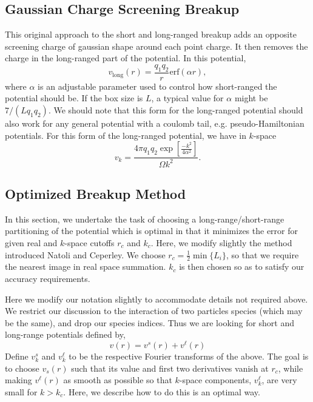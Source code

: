 \subsection{Gaussian Charge Screening Breakup}
This original approach to the short and long-ranged breakup adds an
opposite screening charge of gaussian shape around each point charge.
It then removes the charge in the long-ranged part of the potential.
In this potential,
\begin{equation}
v_{\text{long}}(r) = \frac{q_1 q_2}{r} \text{erf}(\alpha r),
\end{equation}
where $\alpha$ is an adjustable parameter used to control how
short-ranged the potential should be.  If the box size is $L$, a
typical value for $\alpha$ might be $7/(Lq_1 q_2)$. We should note
that this form for the long-ranged potential should also work for any
general potential with a coulomb tail, e.g. pseudo-Hamiltonian
potentials.  For this form of the long-ranged potential, we have in $k$-space
\begin{equation}
v_k = \frac{4\pi q_1 q_2 \exp\left[\frac{-k^2}{4\alpha^2}\right]}{\Omega k^2}.
\end{equation}

\subsection{Optimized Breakup Method}
In this section, we undertake the task of choosing a
long-range/short-range partitioning of the potential which is optimal
in that it minimizes the error for given real and $k$-space cutoffs
$r_c$ and $k_c$.  Here, we modify slightly the method introduced
Natoli and Ceperley\cite{Natoli1995}. We choose $r_c =
\frac{1}{2}\min\{L_i\}$, so that we require the nearest image in
real space summation.  $k_c$ is then chosen so as to satisfy our
accuracy requirements.

Here we modify our notation slightly to accommodate details not
required above.  We restrict our discussion to the interaction of two
particles species (which may be the same), and drop our species
indices.  Thus we are looking for short and long-range potentials
defined by,
\renewcommand{\vs}{v^s}
\newcommand{\vl}{v^\ell}
\begin{equation}
v(r) = \vs(r) + \vl(r)
\end{equation}
Define $\vs_k$ and $\vl_k$ to be the respective Fourier transforms of
the above.  The goal is to choose $v_s(r)$ such that its value and
first two derivatives vanish at $r_c$, while making $\vl(r)$ as smooth as
possible so that $k$-space components, $\vl_k$, are very small for
$k>k_c$.  Here, we describe how to do this is an optimal way.

